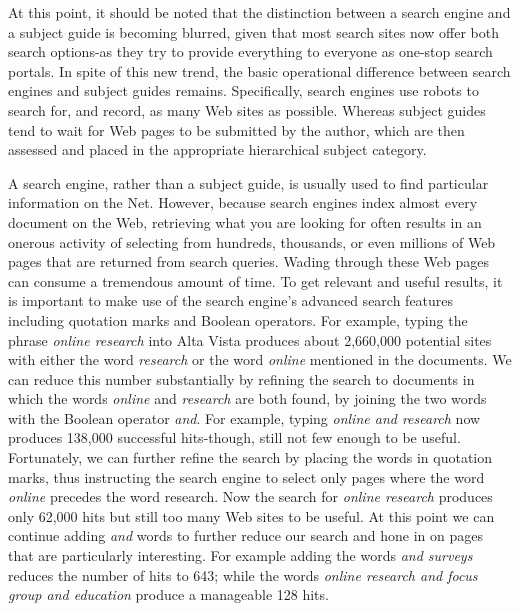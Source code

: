 \documentclass{article}
\begin{document}
At this point, it should be noted that the distinction between a search engine and a subject guide is becoming blurred, given that most search sites now offer both search options-as they try to provide everything to everyone as one-stop search portals. In spite of this new trend, the basic operational difference between search engines and subject guides remains. Specifically, search engines use robots to search for, and record, as many Web sites as possible. Whereas subject guides tend to wait for Web pages to be submitted by the author, which are then assessed and placed in the appropriate hierarchical subject category.

A search engine, rather than a subject guide, is usually used to find particular information on the Net. However, because search engines index almost every document on the Web, retrieving what you are looking for often results in an onerous activity of selecting from hundreds, thousands, or even millions of Web pages that are returned from search queries. Wading through these Web pages can consume a tremendous amount of time. To get relevant and useful results, it is important to make use of the search engine's advanced search features including quotation marks and Boolean operators. For example, typing the phrase \textit{online research} into Alta Vista produces about 2,660,000 potential sites with either the word \textit{research} or the word \textit{online} mentioned in the documents. We can reduce this number substantially by refining the search to documents in which the words \textit{online} and \textit{research} are both found, by joining the two words with the Boolean operator \textit{and}. For example, typing \textit{online and research} now produces 138,000 successful hits-though, still not few enough to be useful. Fortunately, we can further refine the search by placing the words in quotation marks, thus instructing the search engine to select only pages where the word \textit{online} precedes the word research. Now the search for \textit{online research} produces only 62,000 hits but still too many Web sites to be useful. At this point we can continue adding \textit{and} words to further reduce our search and hone in on pages that are particularly interesting. For example adding the words \textit{and surveys} reduces the number of hits to 643; while the words \textit{online research and focus group and education} produce a manageable 128 hits.
\end{document}
